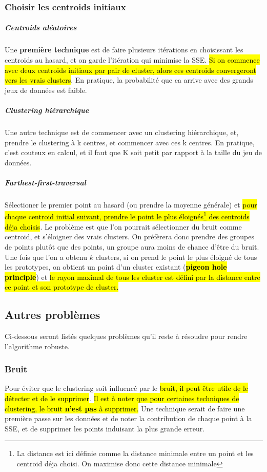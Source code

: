 \documentclass[letterpaper, 12pt]{article}
\newcommand{\alinea}{
\hspace*{0.5cm}}
\begin{document}
			\subsubsection{Choisir les centroids initiaux}
				\subparagraph{Centroids aléatoires}	
					Une \textbf{première technique} est de
					faire plusieurs itérations en choisissant
					les centroids au hasard, et on garde l'itération
					qui minimise la SSE. \hl{Si on commence avec deux
					centroids initiaux par pair de cluster, alors
					ces centroids convergeront vers les vrais clusters}.
					En pratique, la probabilité que ca arrive avec des grands
					jeux de données est faible.
				\subparagraph{Clustering hiérarchique} Une autre technique
					est de commencer avec un clustering hiérarchique,
					et, prendre le clustering à k centres, et commencer avec
					ces k centres. En pratique, c'est couteux en calcul,
					et il faut que K soit petit par rapport à la taille
					du jeu de données.
				\subparagraph{Farthest-first-traversal} Sélectioner
					le premier point au hasard (ou prendre la moyenne 
					générale) et \hl{pour chaque centroid initial suivant,
					prendre le point le plus éloignés\footnote{%
					La distance est ici définie comme la distance minimale
					entre un point et les centroid déja choisi. On 
					maximise donc cette distance minimale} 
					des centroids déja
					choisis}. Le problème est que l'on pourrait sélectionner
					du bruit comme centroid, et s'éloigner des vrais clusters.
					On préfèrera donc prendre des groupes de points plutôt
					que des points, un groupe aura moins de chance d'être du
					bruit. Une fois que l'on a obtenu $k$ clusters, si on 
					prend le point le plus éloigné de tous les prototypes,
					on obtient un point d'un cluster existant 
					(\hl{\textbf{pigeon hole principle}}) et \hl{le rayon
					maximal de tous les cluster est défini par la distance
					entre ce point et son prototype de cluster.}
		\subsection{Autres problèmes}
			\alinea Ci-dessous seront listés quelques problèmes qu'il reste
				à résoudre pour rendre l'algorithme robuste.
			\subsubsection{Bruit}
				\alinea Pour éviter que le clustering soit influencé
					par le \hl{bruit, il peut être utile de le détecter et
					de le supprimer}. \hl{Il est à noter que pour certaines
					techniques de clustering, le bruit \textbf{n'est pas} à 
					supprimer.} Une technique serait de faire une première
					passe sur les données et de noter la contribution
					de chaque point à la SSE, et de supprimer les points
					induisant la plus grande erreur.
\end{document}
